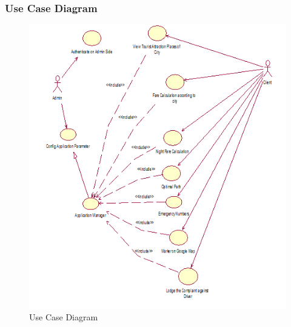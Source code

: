 \documentclass[12pt,a4paper]{article}
\begin{document}
{{{{{{\subsubsection{Use Case Diagram}
\begin{figure}[!htb]
\centering
\includegraphics[width=15 cm]{UseCase}
\caption{Use Case Diagram}
\end{figure}
\newpage
}}}}}}
\end{document}
